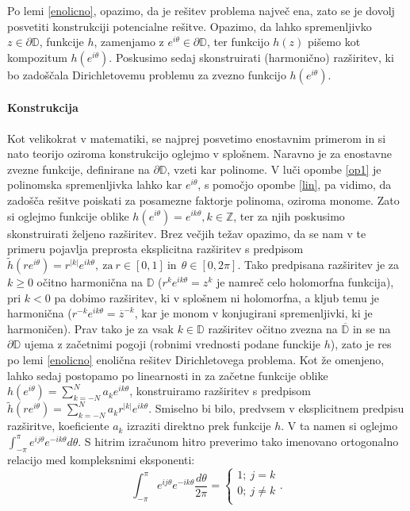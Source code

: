 \documentclass[mat1]{fmfdelo}
\begin{document}
    \begin{opomba}
        \label{op1}
        Po lemi \ref{enolicno}, opazimo, da je rešitev problema največ ena, zato se je dovolj posvetiti konstrukciji potencialne rešitve. 
        Opazimo, da lahko spremenljivko $z \in \partial \mathbb{D}$, funkcije $h$, zamenjamo z $e^{i \theta} \in \partial \mathbb{D}$, ter funkcijo $h(z)$ pišemo kot kompozitum $h(e^{i \theta})$.
        Poskusimo sedaj skonstruirati (harmonično) razširitev, ki bo zadoščala Dirichletovemu problemu za zvezno funkcijo $h(e^{i \theta})$.
    \end{opomba}

    \paragraph[short]{\textbf{Konstrukcija}}
    Kot velikokrat v matematiki, se najprej posvetimo enostavnim primerom in si nato teorijo oziroma konstrukcijo oglejmo v splošnem. 
    Naravno je za enostavne zvezne funkcije, definirane na $\partial \mathbb{D}$, vzeti kar polinome. V luči opombe \ref{op1} je polinomska spremenljivka lahko kar $e^{i\theta}$, s pomočjo opombe \ref{lin}, pa vidimo, da zadošča rešitve poiskati za posamezne faktorje polinoma, oziroma monome. 
    Zato si oglejmo funkcije oblike $h(e^{i \theta}) = e^{i k \theta}, k \in \mathbb{Z}$, ter za njih poskusimo skonstruirati željeno razširitev. 
    Brez večjih težav opazimo, da se nam v te primeru pojavlja preprosta eksplicitna razširitev s predpisom $\widetilde{h}(r e^{i \theta}) = r^{|k|}e^{i k \theta},~\text{za}~r\in [0, 1]~\text{in}~~\theta \in [0, 2\pi]$. 
    Tako predpisana razširitev je za $k \geq 0$ očitno harmonična na $\mathbb{D}$ ($r^k e^{ik\theta} = z^k$ je namreč celo holomorfna funkcija), pri $k < 0$ pa dobimo razširitev, ki v splošnem ni holomorfna, a kljub temu je harmonična ($r^{-k} e^{ik\theta} = \overline{z}^{-k}$, kar je monom v konjugirani spremenljivki, ki je harmoničen).
    Prav tako je za vsak $k \in \mathbb{D}$ razširitev očitno zvezna na $\overline{\mathbb{D}}$ in se na $\partial \mathbb{D}$ ujema z začetnimi pogoji (robnimi vrednosti podane funckije $h$), zato je res po lemi \ref{enolicno} enolična rešitev Dirichletovega problema. 
    Kot že omenjeno, lahko sedaj postopamo po linearnosti in za začetne funkcije oblike $h(e^{i\theta}) = \sum_{k = -N}^{N}{a_k e^{ik\theta}}$, konstruiramo razširitev s predpisom
    $\widetilde{h}(r e^{i \theta}) = \sum_{k = -N}^{N}{a_k r^{|k|}e^{ik\theta}}$. Smiselno bi bilo, predvsem v eksplicitnem predpisu razširitve, koeficiente $a_k$ izraziti direktno prek funkcije $h$. 
    V ta namen si oglejmo $\int_{-\pi}^{\pi}{e^{ij\theta} e^{-ik\theta}d\theta}$. S hitrim izračunom hitro preverimo tako imenovano ortogonalno relacijo med kompleksnimi eksponenti:
        $$
        \int_{-\pi}^{\pi}{e^{ij\theta} e^{-ik\theta}\frac{d\theta}{2\pi}} = 
        \begin{cases}
            1;~j=k\\
            0;~ j \neq k\\
        \end{cases}
        .$$
\end{document}
